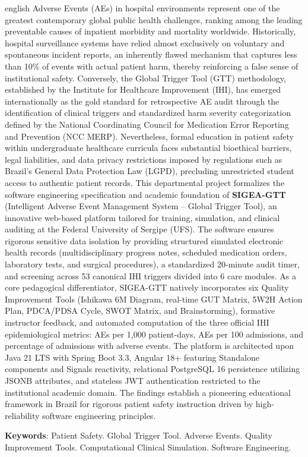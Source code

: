 \setlength{\absparsep}{18pt}
\begin{resumo}[Abstract]
 \begin{otherlanguage*}{english}
Adverse Events (AEs) in hospital environments represent one of the greatest contemporary global public health challenges, ranking among the leading preventable causes of inpatient morbidity and mortality worldwide. Historically, hospital surveillance systems have relied almost exclusively on voluntary and spontaneous incident reports, an inherently flawed mechanism that captures less than 10\% of events with actual patient harm, thereby reinforcing a false sense of institutional safety. Conversely, the Global Trigger Tool (GTT) methodology, established by the Institute for Healthcare Improvement (IHI), has emerged internationally as the gold standard for retrospective AE audit through the identification of clinical triggers and standardized harm severity categorization defined by the National Coordinating Council for Medication Error Reporting and Prevention (NCC MERP). Nevertheless, formal education in patient safety within undergraduate healthcare curricula faces substantial bioethical barriers, legal liabilities, and data privacy restrictions imposed by regulations such as Brazil's General Data Protection Law (LGPD), precluding unrestricted student access to authentic patient records. This departmental project formalizes the software engineering specification and academic foundation of \textbf{SIGEA-GTT} (Intelligent Adverse Event Management System – Global Trigger Tool), an innovative web-based platform tailored for training, simulation, and clinical auditing at the Federal University of Sergipe (UFS). The software ensures rigorous sensitive data isolation by providing structured simulated electronic health records (multidisciplinary progress notes, scheduled medication orders, laboratory tests, and surgical procedures), a standardized 20-minute audit timer, and screening across 53 canonical IHI triggers divided into 6 care modules. As a core pedagogical differentiator, SIGEA-GTT natively incorporates six Quality Improvement Tools (Ishikawa 6M Diagram, real-time GUT Matrix, 5W2H Action Plan, PDCA/PDSA Cycle, SWOT Matrix, and Brainstorming), formative instructor feedback, and automated computation of the three official IHI epidemiological metrics: AEs per 1,000 patient-days, AEs per 100 admissions, and percentage of admissions with adverse events. The platform is architected upon Java 21 LTS with Spring Boot 3.3, Angular 18+ featuring Standalone components and Signals reactivity, relational PostgreSQL 16 persistence utilizing JSONB attributes, and stateless JWT authentication restricted to the institutional academic domain. The findings establish a pioneering educational framework in Brazil for rigorous patient safety instruction driven by high-reliability software engineering principles.

   \vspace{\onelineskip}
 
   \noindent 
   \textbf{Keywords}: Patient Safety. Global Trigger Tool. Adverse Events. Quality Improvement Tools. Computational Clinical Simulation. Software Engineering.
 \end{otherlanguage*}
\end{resumo}